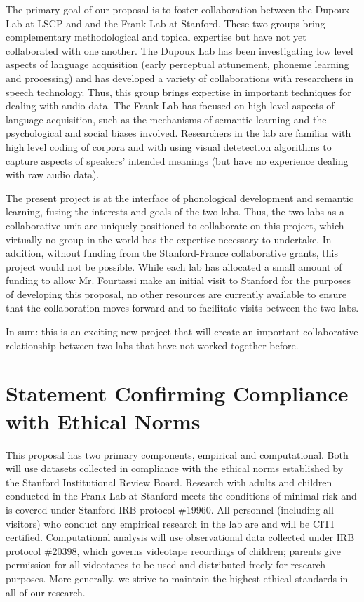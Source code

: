 \documentclass[12pt]{article}
\begin{document}
The primary goal of our proposal is to foster collaboration between the Dupoux Lab at LSCP and and the Frank Lab at Stanford. These two groups bring complementary methodological and topical expertise but have not yet collaborated with one another. The Dupoux Lab has been investigating low level aspects of language acquisition (early perceptual attunement, phoneme learning and processing) and has developed a variety of collaborations with researchers in speech technology. Thus, this group brings expertise in important techniques for dealing with audio data. The Frank Lab has focused on high-level aspects of language acquisition, such as the mechanisms of semantic learning and the psychological and social biases involved. Researchers in the lab are familiar with high level coding of corpora and with using visual detetection algorithms to capture aspects of speakers' intended meanings (but have no experience dealing with raw audio data).

The present project is at the interface of phonological development and semantic learning, fusing the interests and goals of the two labs. Thus, the two labs as a collaborative unit are uniquely positioned to collaborate on this project, which virtually no group in the world has the expertise necessary to undertake. In addition, without funding from the Stanford-France collaborative grants, this project would not be possible. While each lab has allocated a small amount of funding to allow Mr. Fourtassi make an initial visit to Stanford for the purposes of developing this proposal, no other resources are currently available to ensure that the collaboration moves forward and to facilitate visits between the two labs. 

In sum: this is an exciting new project that will create an important collaborative relationship between two labs that have not worked together before.

\newpage

\section*{Statement Confirming Compliance with Ethical Norms}
 
This proposal has two primary components, empirical and computational. Both will use datasets collected in compliance with the ethical norms established by the Stanford Institutional Review Board. Research with adults and children conducted in the Frank Lab at Stanford meets the conditions of minimal risk and is covered under Stanford IRB protocol \#19960. All personnel (including all visitors) who conduct any empirical research in the lab are and will be CITI certified. Computational analysis will use observational data collected under IRB protocol \#20398, which governs videotape recordings of children; parents give permission for all videotapes to be used and distributed freely for research purposes. More generally, we strive to maintain the highest ethical standards in all of our research. 
\end{document}
